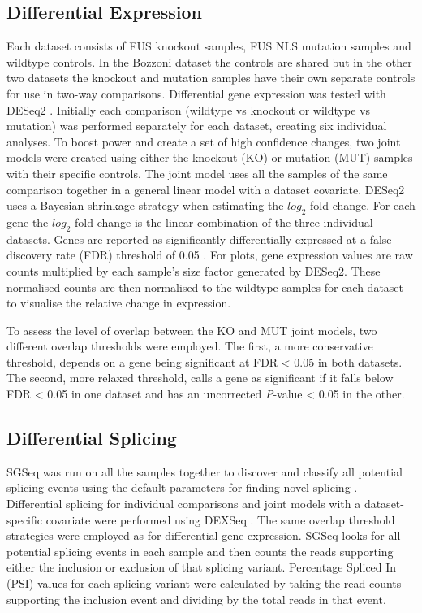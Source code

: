 \subsection{Differential Expression}
 Each dataset consists of FUS knockout samples, FUS NLS mutation samples and wildtype controls.
In the Bozzoni dataset the controls are shared but in the other two datasets the knockout and mutation samples have their own separate controls for use in two-way comparisons.
Differential gene expression was tested with DESeq2 \citep{Love2014}.
Initially each comparison (wildtype vs knockout or wildtype vs mutation) was performed separately for each dataset, creating six individual analyses.
To boost power and create a set of high confidence changes, two joint models were created using either the knockout (KO) or mutation (MUT) samples with their specific controls.
The joint model uses all the samples of the same comparison together in a general linear model with a dataset covariate. 
DESeq2 uses a Bayesian shrinkage strategy when estimating the $log_2$ fold change. 
For each gene the $log_2$ fold change is the linear combination of the three individual datasets.
Genes are reported as significantly differentially expressed at a false discovery rate (FDR) threshold of 0.05 \citep{Benjamini1995}. 
For plots, gene expression values are  raw counts multiplied by each sample's size factor generated by DESeq2. 
These normalised counts are then normalised to the wildtype samples for each dataset to visualise the relative change in expression.

To assess the level of overlap between the KO and MUT joint models, two different overlap thresholds were employed.
The first, a more conservative threshold, depends on a gene being significant at FDR < 0.05 in both datasets.
The second, more relaxed threshold, calls a gene as significant if it falls below FDR < 0.05 in one dataset and has an uncorrected \textit{P}-value < 0.05 in the other.

\subsection{Differential Splicing}
SGSeq was run on all the samples together to discover and classify all potential splicing events using the default parameters for finding novel splicing \citep{Goldstein2016}. 
Differential splicing for individual comparisons and joint models with a dataset-specific covariate were performed using DEXSeq \citep{Anders2012}.
The same overlap threshold strategies were employed as for differential gene expression.
SGSeq looks for all potential splicing events in each sample and then counts the reads supporting either the inclusion or exclusion of that splicing variant. 
Percentage Spliced In (PSI) values  \citep{Katz2010-ir} for each splicing variant were calculated by taking the read counts supporting the inclusion event and dividing by the total reads in that event. 

